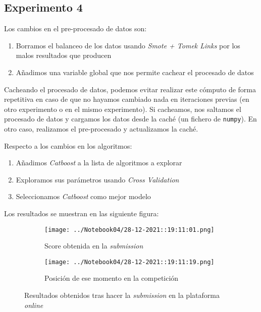 \documentclass[11pt]{article}
\begin{document}
\pagebreak

\subsection{Experimento 4}

Los cambios en el pre-procesado de datos son:

\begin{enumerate}
    \item Borramos el balanceo de los datos usando \emph{Smote + Tomek Links} por los malos resultados que producen
    \item Añadimos una variable global que nos permite cachear el procesado de datos
\end{enumerate}

Cacheando el procesado de datos, podemos evitar realizar este cómputo de forma repetitiva en caso de que no hayamos cambiado nada en iteraciones previas (en otro experimento o en el mismo experimento). Si cacheamos, nos saltamos el procesado de datos y cargamos los datos desde la caché (un fichero de \lstinline{numpy}). En otro caso, realizamos el pre-procesado y actualizamos la caché.

Respecto a los cambios en los algoritmos:

\begin{enumerate}
    \item Añadimos \emph{Catboost} a la lista de algoritmos a explorar
    \item Exploramos sus parámetros usando \emph{Cross Validation}
    \item Seleccionamos \emph{Catboost} como mejor modelo
\end{enumerate}

Los resultados se muestran en las siguiente figura:

\begin{figure}[H]
    \centering

    \begin{subfigure}[b]{0.45 \textwidth}
        \texttt{[image: ../Notebook04/28-12-2021::19:11:01.png]}
        \caption{Score obtenida en la \emph{submission}}
    \end{subfigure}
    \begin{subfigure}[b]{0.45 \textwidth}
        \texttt{[image: ../Notebook04/28-12-2021::19:11:19.png]}
        \caption{Posición de ese momento en la competición}
    \end{subfigure}

    \caption{Resultados obtenidos tras hacer la \emph{submission} en la plataforma \emph{online}}
\end{figure}
\end{document}
